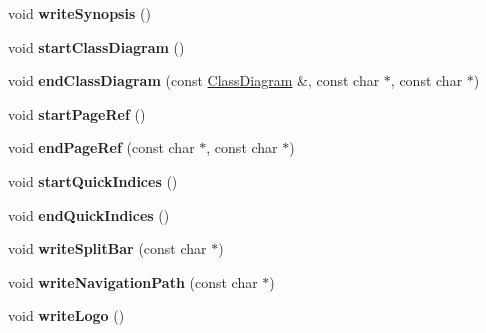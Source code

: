 \begin{DoxyCompactItemize}
\item 
\hypertarget{class_man_generator_acba0caaf7ea5f4acb9b4bf3ccbf2ee68}{void {\bfseries write\-Synopsis} ()}\label{class_man_generator_acba0caaf7ea5f4acb9b4bf3ccbf2ee68}

\item 
\hypertarget{class_man_generator_ab9f199144725218464219039e2e7284e}{void {\bfseries start\-Class\-Diagram} ()}\label{class_man_generator_ab9f199144725218464219039e2e7284e}

\item 
\hypertarget{class_man_generator_a723ed80335c8a31791b12302cf6f9cc5}{void {\bfseries end\-Class\-Diagram} (const \hyperlink{class_class_diagram}{Class\-Diagram} \&, const char $\ast$, const char $\ast$)}\label{class_man_generator_a723ed80335c8a31791b12302cf6f9cc5}

\item 
\hypertarget{class_man_generator_acb1f8019fc7ab54bdba19c92ef4a223d}{void {\bfseries start\-Page\-Ref} ()}\label{class_man_generator_acb1f8019fc7ab54bdba19c92ef4a223d}

\item 
\hypertarget{class_man_generator_a0e845e76703cf2a22b8c801febfe14c8}{void {\bfseries end\-Page\-Ref} (const char $\ast$, const char $\ast$)}\label{class_man_generator_a0e845e76703cf2a22b8c801febfe14c8}

\item 
\hypertarget{class_man_generator_a1003d38afed51e3e932a61be3b2d71a4}{void {\bfseries start\-Quick\-Indices} ()}\label{class_man_generator_a1003d38afed51e3e932a61be3b2d71a4}

\item 
\hypertarget{class_man_generator_a8ccfa7b4cc697673db66d95470901da6}{void {\bfseries end\-Quick\-Indices} ()}\label{class_man_generator_a8ccfa7b4cc697673db66d95470901da6}

\item 
\hypertarget{class_man_generator_a465317b1419a8fc5bfb7cb94cddbfc98}{void {\bfseries write\-Split\-Bar} (const char $\ast$)}\label{class_man_generator_a465317b1419a8fc5bfb7cb94cddbfc98}

\item 
\hypertarget{class_man_generator_aa3b9c49f8e870752e8751d1a6c72b2c0}{void {\bfseries write\-Navigation\-Path} (const char $\ast$)}\label{class_man_generator_aa3b9c49f8e870752e8751d1a6c72b2c0}

\item 
\hypertarget{class_man_generator_ac7d0ac7d2abfeba04c9c22a3974221ae}{void {\bfseries write\-Logo} ()}\label{class_man_generator_ac7d0ac7d2abfeba04c9c22a3974221ae}


\end{DoxyCompactItemize}
